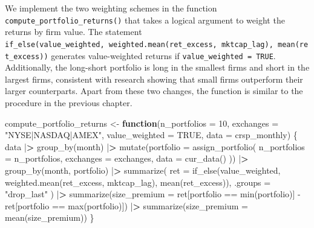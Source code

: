 \documentclass[
]{book}
\newenvironment{Shaded}{\begin{snugshade}}{\end{snugshade}}
\newcommand{\AttributeTok}[1]{\textcolor[rgb]{0.61,0.61,0.61}{#1}}
\newcommand{\ConstantTok}[1]{\textcolor[rgb]{0,0,0}{#1}}
\newcommand{\ControlFlowTok}[1]{\textcolor[rgb]{0.27,0.27,0.27}{\textbf{#1}}}
\newcommand{\DecValTok}[1]{\textcolor[rgb]{0.06,0.06,0.06}{#1}}
\newcommand{\ErrorTok}[1]{\textcolor[rgb]{0.14,0.14,0.14}{\textbf{#1}}}
\newcommand{\FunctionTok}[1]{\textcolor[rgb]{0,0,0}{#1}}
\newcommand{\NormalTok}[1]{#1}
\newcommand{\OtherTok}[1]{\textcolor[rgb]{0.37,0.37,0.37}{#1}}
\newcommand{\SpecialCharTok}[1]{\textcolor[rgb]{0,0,0}{#1}}
\newcommand{\StringTok}[1]{\textcolor[rgb]{0.5,0.5,0.5}{#1}}
\begin{document}
We implement the two weighting schemes in the function \texttt{compute\_portfolio\_returns()} that takes a logical argument to weight the returns by firm value. The statement \texttt{if\_else(value\_weighted,\ weighted.mean(ret\_excess,\ mktcap\_lag),\ mean(ret\_excess))} generates value-weighted returns if \texttt{value\_weighted\ =\ TRUE}. Additionally, the long-short portfolio is long in the smallest firms and short in the largest firms, consistent with research showing that small firms outperform their larger counterparts. Apart from these two changes, the function is similar to the procedure in the previous chapter.

\begin{Shaded}
\begin{Highlighting}[]
\NormalTok{compute\_portfolio\_returns }\OtherTok{\textless{}{-}} \ControlFlowTok{function}\NormalTok{(}\AttributeTok{n\_portfolios =} \DecValTok{10}\NormalTok{,}
                                      \AttributeTok{exchanges =} \StringTok{"NYSE|NASDAQ|AMEX"}\NormalTok{,}
                                      \AttributeTok{value\_weighted =} \ConstantTok{TRUE}\NormalTok{,}
                                      \AttributeTok{data =}\NormalTok{ crsp\_monthly) \{}
\NormalTok{  data }\SpecialCharTok{|}\ErrorTok{\textgreater{}}
    \FunctionTok{group\_by}\NormalTok{(month) }\SpecialCharTok{|}\ErrorTok{\textgreater{}}
    \FunctionTok{mutate}\NormalTok{(}\AttributeTok{portfolio =} \FunctionTok{assign\_portfolio}\NormalTok{(}
      \AttributeTok{n\_portfolios =}\NormalTok{ n\_portfolios,}
      \AttributeTok{exchanges =}\NormalTok{ exchanges,}
      \AttributeTok{data =} \FunctionTok{cur\_data}\NormalTok{()}
\NormalTok{    )) }\SpecialCharTok{|}\ErrorTok{\textgreater{}}
    \FunctionTok{group\_by}\NormalTok{(month, portfolio) }\SpecialCharTok{|}\ErrorTok{\textgreater{}}
    \FunctionTok{summarize}\NormalTok{(}
      \AttributeTok{ret =} \FunctionTok{if\_else}\NormalTok{(value\_weighted, }
                    \FunctionTok{weighted.mean}\NormalTok{(ret\_excess, mktcap\_lag), }\FunctionTok{mean}\NormalTok{(ret\_excess)),}
      \AttributeTok{.groups =} \StringTok{"drop\_last"}
\NormalTok{    ) }\SpecialCharTok{|}\ErrorTok{\textgreater{}}
    \FunctionTok{summarize}\NormalTok{(}\AttributeTok{size\_premium =}\NormalTok{ ret[portfolio }\SpecialCharTok{==} \FunctionTok{min}\NormalTok{(portfolio)] }\SpecialCharTok{{-}} 
\NormalTok{                ret[portfolio }\SpecialCharTok{==} \FunctionTok{max}\NormalTok{(portfolio)]) }\SpecialCharTok{|}\ErrorTok{\textgreater{}}
    \FunctionTok{summarize}\NormalTok{(}\AttributeTok{size\_premium =} \FunctionTok{mean}\NormalTok{(size\_premium))}
\NormalTok{\}}
\end{Highlighting}
\end{Shaded}
\end{document}
